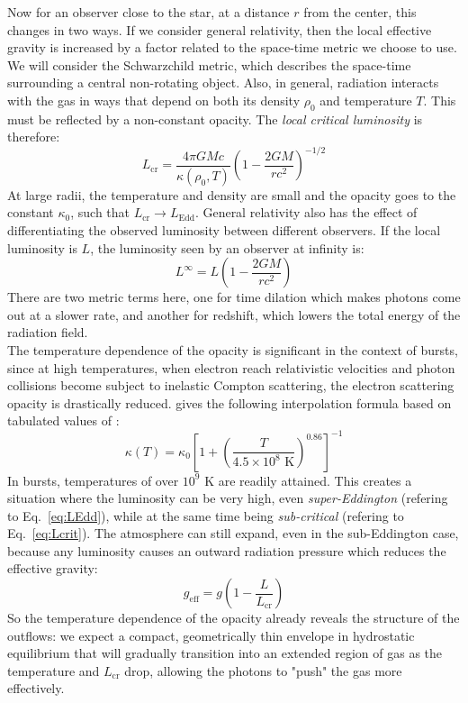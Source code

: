 \documentclass[../main.tex]{subfiles}
\newcommand{\Lcr}{L_\text{cr}}
\newcommand{\Ledd}{L_\text{Edd}}
\newcommand{\Linf}{L^\infty}
\begin{document}
Now for an observer close to the star, at a distance $r$ from the center, this changes in two ways. If we consider general relativity, then the local effective gravity is increased by a factor related to the space-time metric we choose to use. We will consider the Schwarzchild metric, which describes the space-time surrounding a central non-rotating object. Also, in general, radiation interacts with the gas in ways that depend on both its density $\rho_0$ and temperature $T$. This must be reflected by a non-constant opacity. The \textit{local critical luminosity} is therefore:
\begin{equation}\label{eq:Lcrit}
    \Lcr=\frac{4\pi GMc}{\kappa(\rho_0,T)}\left(1-\frac{2GM}{rc^2}\right)^{-1/2}    
\end{equation}
At large radii, the temperature and density are small and the opacity goes to the constant $\kappa_0$, such that $\Lcr\rightarrow \Ledd$. General relativity also has the effect of differentiating the observed luminosity between different observers.  If the local luminosity is $L$, the luminosity seen by an observer at infinity is:
\begin{equation}\label{eq:Linf}
    \Linf=L\left(1-\frac{2GM}{rc^2}\right)
\end{equation}
There are two metric terms here, one for time dilation which makes photons come out at a slower rate, and another for redshift, which lowers the total energy of the radiation field. \\


The temperature dependence of the opacity is significant in the context of bursts, since at high temperatures, when electron reach relativistic velocities and photon collisions become subject to inelastic Compton scattering, the electron scattering opacity is drastically reduced. \citet{Paczynski1983} gives the following interpolation formula based on tabulated values of \citet{Buchler1976}:
\begin{equation}\label{eq:kappa}
    \kappa(T)=\kappa_0 \left[1+\left(\frac{T}{4.5\times 10^8 \text{ K}}\right)^{0.86}\right]^{-1}
\end{equation}
In bursts, temperatures of over $10^9$ K are readily attained. This creates a situation where the luminosity can be very high, even \textit{super-Eddington} (refering to Eq.~\ref{eq:LEdd}), while at the same time being \textit{sub-critical} (refering to Eq.~\ref{eq:Lcrit}). The atmosphere can still expand, even in the sub-Eddington case, because any luminosity causes an outward radiation pressure which reduces the effective gravity:
\begin{equation}\label{eq:geff}
    g_\text{eff}=g\left(1-\frac{L}{\Lcr}\right)
\end{equation}
So the temperature dependence of the opacity already reveals the structure of the outflows: we expect a compact, geometrically thin envelope in hydrostatic equilibrium that will gradually transition into an extended region of gas as the temperature and $\Lcr$ drop, allowing the photons to "push" the gas more effectively.\\
\end{document}

